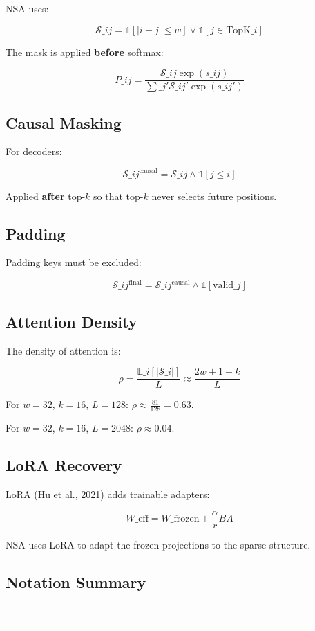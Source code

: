 NSA uses:

\[
\mathcal{S}\_{ij} = \mathbb{1}[|i - j| \leq w] \lor \mathbb{1}[j \in \text{TopK}\_i]
\tag{3.4}
\]

The mask is applied \textbf{before} softmax:

\[
P\_{ij} = \frac{\mathcal{S}\_{ij} \exp(s\_{ij})}{\sum\_{j'} \mathcal{S}\_{ij'} \exp(s\_{ij'})}
\tag{3.5}
\]

\subsection{Causal Masking}

For decoders:

\[
\mathcal{S}\_{ij}^\text{causal} = \mathcal{S}\_{ij} \land \mathbb{1}[j \leq i]
\tag{3.6}
\]

Applied \textbf{after} top-$k$ so that top-$k$ never selects future positions.

\subsection{Padding}

Padding keys must be excluded:

\[
\mathcal{S}\_{ij}^\text{final} = \mathcal{S}\_{ij}^\text{causal} \land \mathbb{1}[\text{valid}\_j]
\tag{3.7}
\]

\subsection{Attention Density}

The density of attention is:

\[
\rho = \frac{\mathbb{E}\_i[|\mathcal{S}\_i|]}{L} \approx \frac{2w + 1 + k}{L}
\tag{3.8}
\]

For $w = 32$, $k = 16$, $L = 128$: $\rho \approx \frac{81}{128} = 0.63$.

For $w = 32$, $k = 16$, $L = 2048$: $\rho \approx 0.04$.

\subsection{LoRA Recovery}

LoRA (Hu et al., 2021) adds trainable adapters:

\[
W\_\text{eff} = W\_\text{frozen} + \frac{\alpha}{r} B A
\tag{3.9}
\]

NSA uses LoRA to adapt the frozen projections to the sparse structure.

\subsection{Notation Summary}

\begin{lstlisting}

---
\end{lstlisting}